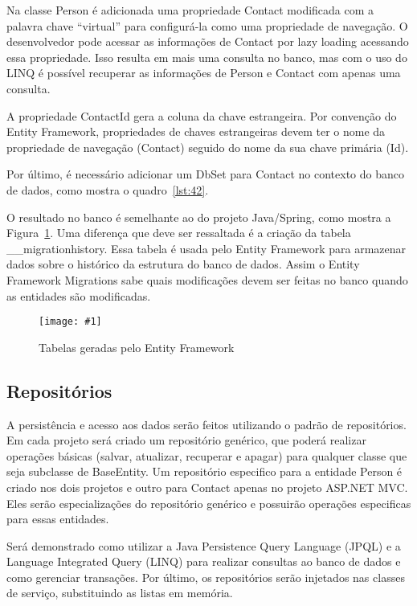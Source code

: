 \documentclass[a4paper,12pt]{article}
\newcommand{\figura}[3] {
	\begin{figure}[ht]
		\centering
		\texttt{[image: \#1]}
		\caption{#2}
		\label{#3}
	\end{figure}
	\FloatBarrier
}
\newcommand{\sharpcode}[3] {
	
	\FloatBarrier
}
\begin{document}
Na classe Person é adicionada uma propriedade Contact modificada com a palavra chave “virtual” para configurá-la como uma propriedade de navegação. O desenvolvedor pode acessar as informações de Contact por lazy loading acessando essa propriedade.  Isso resulta em mais uma consulta no banco, mas com o uso do LINQ é possível recuperar as informações de Person e Contact com apenas uma consulta.

A propriedade ContactId gera a coluna da chave estrangeira. Por convenção do Entity Framework, propriedades de chaves estrangeiras devem ter o nome da propriedade de navegação (Contact) seguido do nome da sua chave primária (Id).

Por último, é necessário adicionar um DbSet para Contact no contexto do banco de dados, como mostra o quadro~\ref{lst:42}.

\sharpcode{code/42.txt}{Classe NetWebCrudContext com o DbSet para Contact}{lst:42}

O resultado no banco é semelhante ao do projeto Java/Spring, como mostra a Figura~\ref{fig:37}. Uma diferença que deve ser ressaltada é a criação da tabela \_\_migrationhistory. Essa tabela é usada pelo Entity Framework para armazenar dados sobre o histórico da estrutura do banco de dados. Assim o Entity Framework Migrations sabe quais modificações devem ser feitas no banco quando as entidades são modificadas.

\figura{37.png}{Tabelas geradas pelo Entity Framework}{fig:37}

\subsection{Repositórios}

A persistência e acesso aos dados serão feitos utilizando o padrão de repositórios. Em cada projeto será criado um repositório genérico, que poderá realizar operações básicas (salvar, atualizar, recuperar e apagar) para qualquer classe que seja subclasse de BaseEntity. Um repositório especifico para a entidade Person é criado nos dois projetos e outro para Contact apenas no projeto ASP.NET MVC. Eles serão especializações do repositório genérico e possuirão operações especificas para essas entidades.

Será demonstrado como utilizar a Java Persistence Query Language (JPQL) e a Language Integrated Query (LINQ) para realizar consultas ao banco de dados e como gerenciar transações. Por último, os repositórios serão injetados nas classes de serviço, substituindo as listas em memória.
\end{document}
